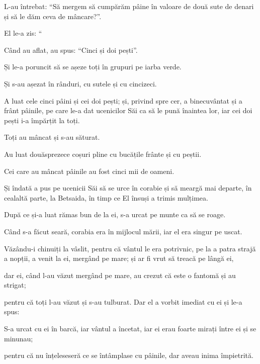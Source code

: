 {\par }{\PP L-au întrebat: “Să mergem să cumpărăm pâine în valoare de două sute de denari și să le dăm ceva de mâncare?”.


\par }{\PP {}El le-a zis: “{}

\par }{\PP Când au aflat, au spus: “Cinci și doi pești”.


\par }{\PP {}Și le-a poruncit să se așeze toți în grupuri pe iarba verde.

Și s-au așezat în rânduri, cu sutele și cu cincizeci.

A luat cele cinci pâini și cei doi pești; și, privind spre cer, a binecuvântat și a frânt pâinile, pe care le-a dat ucenicilor Săi ca să le pună înaintea lor, iar cei doi pești i-a împărțit la toți.

Toți au mâncat și s-au săturat.

Au luat douăsprezece coșuri pline cu bucățile frânte și cu peștii.

Cei care au mâncat pâinile au fost cinci mii de oameni.


\par }{\PP {}Și îndată a pus pe ucenicii Săi să se urce în corabie și să meargă mai departe, în cealaltă parte, la Betsaida, în timp ce El însuși a trimis mulțimea.

După ce și-a luat rămas bun de la ei, s-a urcat pe munte ca să se roage.


\par }{\PP {}Când s-a făcut seară, corabia era în mijlocul mării, iar el era singur pe uscat.

Văzându-i chinuiți la vâslit, pentru că vântul le era potrivnic, pe la a patra strajă a nopții, a venit la ei, mergând pe mare; și ar fi vrut să treacă pe lângă ei,

dar ei, când l-au văzut mergând pe mare, au crezut că este o fantomă și au strigat;

pentru că toți l-au văzut și s-au tulburat. Dar el a vorbit imediat cu ei și le-a spus:
{}

S-a urcat cu ei în barcă, iar vântul a încetat, iar ei erau foarte mirați între ei și se minunau;

pentru că nu înțeleseseră ce se întâmplase cu pâinile, dar aveau inima împietrită.


}
